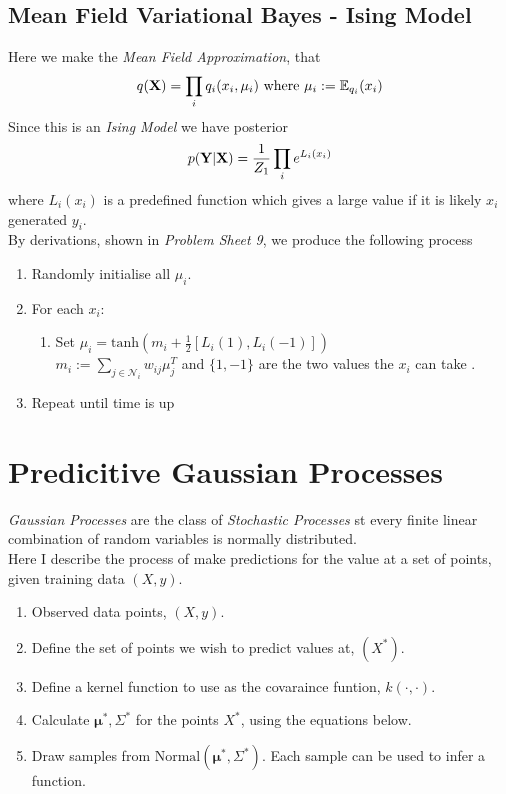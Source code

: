 \documentclass[11pt,a4paper]{article}
\begin{document}
\subsection{Mean Field Variational Bayes - Ising Model}
Here we make the  \textit{Mean Field Approximation}, that
$$q(\textbf{X})=\prod_iq_i(x_i,\mu_i)\text{ where }\mu_i:=\mathbb{E}_{q_i}(x_i)$$
Since this is an \textit{Ising Model} we have posterior
$$p(\textbf{Y}|\textbf{X})=\frac{1}{Z_1}\prod_ie^{L_i(x_i)}$$
where $L_i(x_i)$ is a predefined function which gives a large value if it is likely $x_i$ generated $y_i$.\\
By derivations, shown in \textit{Problem Sheet 9}, we produce the following process
\begin{enumerate}
	\item Randomly initialise all $\mu_i$.
	\item For each $x_i$:
	\begin{enumerate}
		\item Set $\mu_i=\text{tanh}\left(m_i+\frac{1}{2}[L_i(1),L_i(-1)]\right)$\\
		 $m_i:=\sum_{j\in\mathcal{N}_i}w_{ij}\mu_j^T$ and $\{1,-1\}$ are the two values the $x_i$ can take .
	\end{enumerate}
	\item Repeat until time is up
\end{enumerate}

\section{Predicitive Gaussian Processes}
\textit{Gaussian Processes} are the class of \textit{Stochastic Processes} st every finite linear combination of random variables is normally distributed.\\
Here I describe the process of make predictions for the value at a set of points, given training data $(X,y)$.
\begin{enumerate}
	\item Observed data points, $(X,y)$.
	\item Define the set of points we wish to predict values at, $(X^*)$.
	\item Define a kernel function to use as the covaraince funtion, $k(\cdot,\cdot)$.
	\item Calculate $\pmb\mu^*,\Sigma^*$ for the points $X^*$, using the equations below.
	\item Draw samples from $\text{Normal}(\pmb\mu^*,\Sigma^*)$. Each sample can be used to infer a function.
\end{enumerate}
\end{document}
